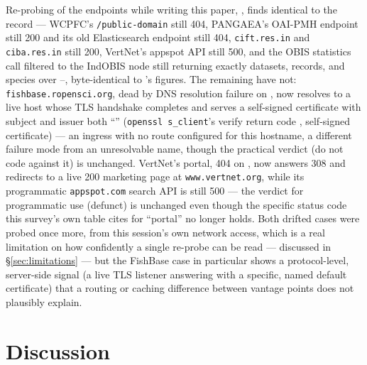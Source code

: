  Re-probing \NEndpointsReprobed{} of
the \NSourcesSurveyed{} endpoints while writing this paper, \AsOf{}, finds
\NEndpointsUnchanged{} identical to the \ProbeDate{} record --- WCPFC's
\texttt{/public-domain} still 404, PANGAEA's OAI-PMH endpoint still 200 and
its old Elasticsearch endpoint still 404, \texttt{cift.res.in} and
\texttt{ciba.res.in} still 200, VertNet's appspot API still 500, and the
OBIS statistics call filtered to the IndOBIS node still returning exactly
\IndObisDatasets{} datasets, \IndObisRecords{} records, and
\IndObisSpecies{} species over \IndObisYearStart{}--\IndObisYearEnd{},
byte-identical to \ProbeDate{}'s figures. The remaining \NEndpointsDrifted{}
have not: \texttt{fishbase.ropensci.org}, dead by DNS resolution failure on
\ProbeDate{}, now resolves to a live host whose TLS handshake completes and
serves a self-signed certificate with subject and issuer both
``\FishbaseCertCN{}'' (\texttt{openssl s\_client}'s verify return code
\FishbaseOpenSSLVerifyCode{}, self-signed certificate) --- an ingress with no
route configured for this hostname, a different failure mode from an
unresolvable name, though the practical verdict (do not code against it) is
unchanged. VertNet's portal, 404 on \ProbeDate{}, now answers 308 and
redirects to a live 200 marketing page at \texttt{www.vertnet.org}, while its
programmatic \texttt{appspot.com} search API is still 500 --- the verdict
for programmatic use (defunct) is unchanged even though the specific status
code this survey's own table cites for ``portal'' no longer holds. Both
drifted cases were probed once more, from this session's own network access,
which is a real limitation on how confidently a single re-probe can be read
--- discussed in \S\ref{sec:limitations} --- but the FishBase case in
particular shows a protocol-level, server-side signal (a live TLS listener
answering with a specific, named default certificate) that a routing or
caching difference between vantage points does not plausibly explain.

\section{Discussion}
\label{sec:discussion}

